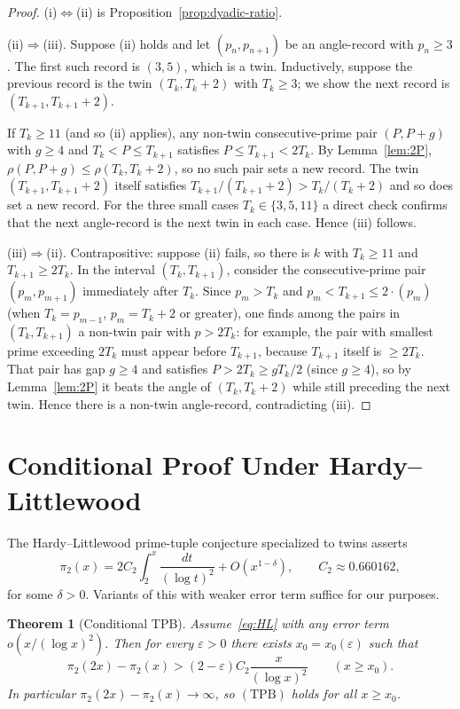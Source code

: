 \documentclass[11pt]{article}
\newtheorem{theorem}{Theorem}
\begin{document}
\begin{proof}
(i)$\Leftrightarrow$(ii) is Proposition~\ref{prop:dyadic-ratio}.

(ii)$\Rightarrow$(iii). Suppose (ii) holds and let $(p_n,p_{n+1})$ be
an angle-record with $p_n\ge 3$. The first such record is $(3,5)$,
which is a twin. Inductively, suppose the previous record is the twin
$(T_k,T_k+2)$ with $T_k\ge 3$; we show the next record is
$(T_{k+1},T_{k+1}+2)$.

If $T_k\ge 11$ (and so (ii) applies), any non-twin consecutive-prime
pair $(P,P+g)$ with $g\ge 4$ and $T_k<P\le T_{k+1}$ satisfies
$P\le T_{k+1}<2T_k$. By Lemma~\ref{lem:2P}, $\rho(P,P+g)\le\rho(T_k,T_k+2)$,
so no such pair sets a new record. The twin
$(T_{k+1},T_{k+1}+2)$ itself satisfies $T_{k+1}/(T_{k+1}+2)>T_k/(T_k+2)$
and so does set a new record. For the three small cases
$T_k\in\{3,5,11\}$ a direct check confirms that the next angle-record
is the next twin in each case. Hence (iii) follows.

(iii)$\Rightarrow$(ii). Contrapositive: suppose (ii) fails, so there
is $k$ with $T_k\ge 11$ and $T_{k+1}\ge 2T_k$. In the interval
$(T_k,T_{k+1})$, consider the consecutive-prime pair
$(p_m,p_{m+1})$ immediately after $T_k$. Since $p_m>T_k$ and
$p_m<T_{k+1}\le 2\cdot(p_m)$ (when $T_k=p_{m-1}$, $p_m=T_k+2$ or
greater), one finds among the pairs in $(T_k,T_{k+1})$ a non-twin pair
with $p>2T_k$: for example, the pair with smallest prime exceeding
$2T_k$ must appear before $T_{k+1}$, because $T_{k+1}$ itself is
$\ge 2T_k$. That pair has gap $g\ge 4$ and satisfies $P>2T_k\ge gT_k/2$
(since $g\ge 4$), so by Lemma~\ref{lem:2P} it beats the angle of
$(T_k,T_k+2)$ while still preceding the next twin. Hence there is a
non-twin angle-record, contradicting (iii).
\end{proof}

\section{Conditional Proof Under Hardy--Littlewood}\label{sec:HL}

The Hardy--Littlewood prime-tuple conjecture specialized to twins
asserts
\begin{equation}\label{eq:HL}
\pi_2(x) = 2C_2\int_2^x\frac{dt}{(\log t)^2}+O(x^{1-\delta}),\qquad
C_2\approx 0.660162,
\end{equation}
for some $\delta>0$. Variants of this with weaker error term suffice
for our purposes.

\begin{theorem}[Conditional TPB]\label{thm:HL}
Assume~\eqref{eq:HL} with any error term $o(x/(\log x)^2)$. Then for
every $\varepsilon>0$ there exists $x_0=x_0(\varepsilon)$ such that
\[
\pi_2(2x)-\pi_2(x)>(2-\varepsilon)C_2\frac{x}{(\log x)^2}
\qquad(x\ge x_0).
\]
In particular $\pi_2(2x)-\pi_2(x)\to\infty$, so $(\mathrm{TPB})$ holds
for all $x\ge x_0$.
\end{theorem}
\end{document}
